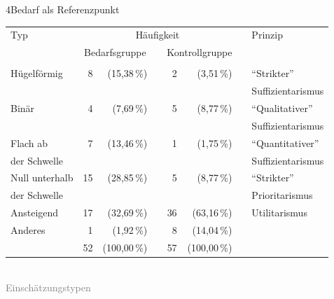 \documentclass[xcolor=table,9pt,aspectratio=169]{beamer}
\begin{document}
\begin{frame}{\vspace*{10mm}4\hspace*{1em}Bedarf als Referenzpunkt}
\begin{center}
   \begin{tabular}[h]{lrrrrrrl}
      \arrayrulecolor{blue2}
      \hline
      Typ              & \multicolumn{5}{c}{Häufigkeit}      &   & Prinzip                                                              \\
      \cline{2-6}
                       & \multicolumn{2}{c}{Bedarfsgruppe}   &   & \multicolumn{2}{c}{Kontrollgruppe}   &   &                           \\
      \hline\hline\\[-0.5em]
      Hügelförmig      &  8   &  (15,38\,\%)                 &   &  2   &   (3,51\,\%)                  &   & \enquote{Strikter}        \\
                       &      &                              &   &      &                               &   & Suffizientarismus         \\[1ex]
      Binär            &  4   &   (7,69\,\%)                 &   &  5   &   (8,77\,\%)                  &   & \enquote{Qualitativer}    \\
                       &      &                              &   &      &                               &   & Suffizientarismus         \\[1ex]
      Flach ab         &  7   &  (13,46\,\%)                 &   &  1   &   (1,75\,\%)                  &   & \enquote{Quantitativer}   \\
      der Schwelle     &      &                              &   &      &                               &   & Suffizientarismus         \\[1ex]
      Null unterhalb   & 15   &  (28,85\,\%)                 &   &  5   &   (8,77\,\%)                  &   & \enquote{Strikter}        \\
      der Schwelle     &      &                              &   &      &                               &   & Prioritarismus            \\[1ex]
      Ansteigend       & 17   &  (32,69\,\%)                 &   & 36   &  (63,16\,\%)                  &   & Utilitarismus             \\[1ex]
      Anderes          &  1   &   (1,92\,\%)                 &   &  8   &  (14,04\,\%)                  &   &                           \\
      \hline
                       & 52   & (100,00\,\%)                 &   & 57   & (100,00\,\%)                  &   &                           \\
      \hline
   \end{tabular}\\
   \smallskip
   \footnotesize{\textcolor{gray}{Einschätzungstypen}}
\end{center}
\end{frame}
\end{document}
